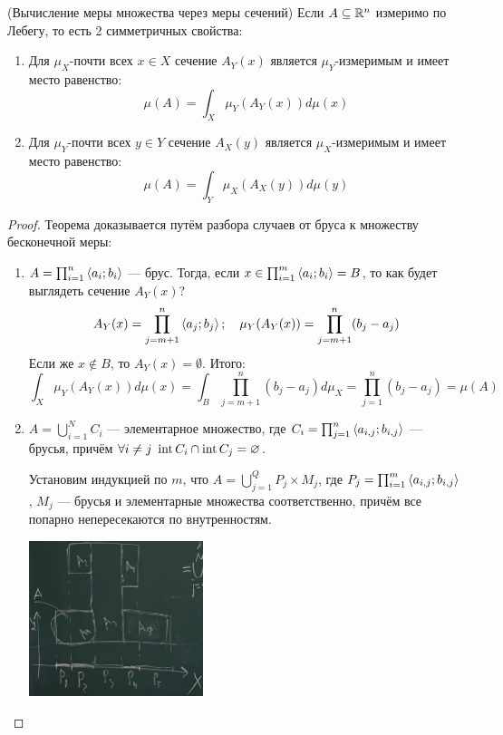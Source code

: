 \begin{theorem} (Вычисление меры множества через меры сечений)
	Если $A \subseteq \mathbb{R}^n$ измеримо по Лебегу, то есть 2 симметричных свойства:
	\begin{enumerate}
		\item Для $\mu_X$-почти всех $x \in X$ сечение $A_Y(x)$ является $\mu_Y$-измеримым и имеет место равенство:
		\[
			\mu(A) = \int_X \mu_Y(A_Y(x))d\mu(x)
		\]
		
		\item Для $\mu_Y$-почти всех $y \in Y$ сечение $A_X(y)$ является $\mu_X$-измеримым и имеет место равенство:
		\[
		\mu(A) = \int_Y \mu_X(A_X(y))d\mu(y)
		\]
	\end{enumerate}
\end{theorem}

\begin{proof}
	Теорема доказывается путём разбора случаев от бруса к множеству бесконечной меры:
	\begin{enumerate}
		\item $A = \prod_{i = 1}^n \left\langle a_i; b_i\right\rangle$ --- брус. Тогда, если $x \in \prod_{i = 1}^m \left\langle a_i; b_i\right\rangle = B$, то как будет выглядеть сечение $A_Y(x)$?
		\[
			A_Y(x) = \prod_{j = m + 1}^n \left\langle a_j; b_j\right\rangle;\ \ \ \mu_Y(A_Y(x)) = \prod_{j = m + 1}^n (b_j - a_j)
		\]
		Если же $x \notin B$, то $A_Y(x) = \emptyset$. Итого:
		\[
			\int_X \mu_Y(A_Y(x))d\mu(x) = \int_{B} \prod_{j = m + 1}^n (b_j - a_j)d\mu_X = \prod_{j = 1}^n (b_j - a_j) = \mu(A)
		\]
		
		\item $A = \bigcup_{i = 1}^N C_i$ --- элементарное множество, где $C_i = \prod_{j = 1}^n \left\langle a_{i, j}; b_{i, j}\right\rangle$ --- брусья, причём $\forall i \neq j\ \operatorname{int} C_i \cap \operatorname{int} C_j = \varnothing$.
		
		Установим индукцией по $m$, что $A = \bigcup_{j = 1}^Q P_j \times M_j$, где $P_j = \prod_{i = 1}^m \left\langle a_{i, j}; b_{i, j}\right\rangle$, $M_j$ --- брусья и элементарные множества соответственно, причём все попарно непересекаются по внутренностям.
		
		\begin{center}
			\includegraphics[width=0.4\textwidth]{images/elementary_section.png}
		\end{center}
		

\end{enumerate}
\end{proof}
